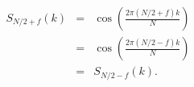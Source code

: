 
\begin{eqnarray}
\label{e2:ny}
S_{{N / 2} + f} (k) & = & \cos ( \frac{2 \pi ({ N / 2 } + f )  k }{ N } ) \nonumber \\
&  = & \cos ( \frac {2 \pi ({ N/ 2 } - f )  k }{ N }  ) \nonumber \\
& = & S_{{N / 2} - f } (k) .
\end{eqnarray}

